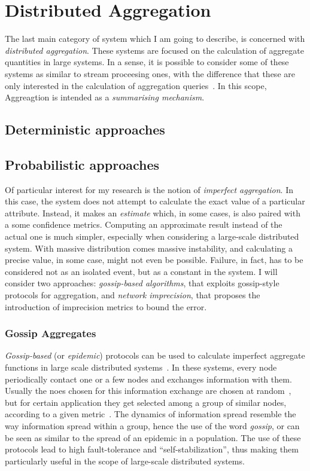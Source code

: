\section{Distributed Aggregation}
\label{sec:dist-agg}

The last main category of system which I am going to describe, is concerned with \emph{distributed aggregation}.
These systems are focused on the calculation of aggregate quantities in large systems. In a sense, it is possible to
consider some of these systems as similar to stream proceesing ones, with the difference that these are only interested
in the calculation of aggregation queries~\cite{astrolabe, sdims, dec-netmon}. In this scope, Aggreagtion is intended as a
\emph{summarising mechanism}.  

\subsection{Deterministic approaches}



\subsection{Probabilistic approaches}
Of particular interest for my research is the notion of \emph{imperfect aggregation}. In this case, the system does not
attempt to calculate the exact value of a particular attribute. Instead, it makes an \emph{estimate} which, in some
cases, is also paired with a some confidence metrics. Computing an approximate result instead of the
actual one is much simpler, especially when considering a large-scale distributed system. With massive distribution comes 
massive instability, and calculating a precise value, in some case, might not even be possible. Failure, in fact, has to
be considered not as an isolated event, but as a constant in the system. I will consider two approaches: \emph{gossip-based 
algorithms}, that exploits gossip-style protocols for aggregation, and \emph{network imprecision}, that proposes the
introduction of imprecision metrics to bound the error.

\subsubsection*{Gossip Aggregates}

\emph{Gossip-based} (or \emph{epidemic}) protocols can be used to calculate imperfect aggregate functions in large scale
distributed systems~\cite{gossip-aggregates, gossip-aggregates-large}. In these systems, every node periodically contact 
one or a few nodes and exchanges information with them. Usually the noes chosen for this information exchange are
chosen at random~\cite{cyclon}, but for certain application they get selected among a group of similar nodes, according
to a given metric~\cite{vicinity}. The dynamics of information spread resemble the way information spread within a
group, hence the use of the word \emph{gossip}, or can be seen as similar to the spread of an epidemic in a population. 
The use of these protocols lead to high fault-tolerance and ``self-stabilization'', thus making them particularly useful
in the scope of large-scale distributed systems. 

